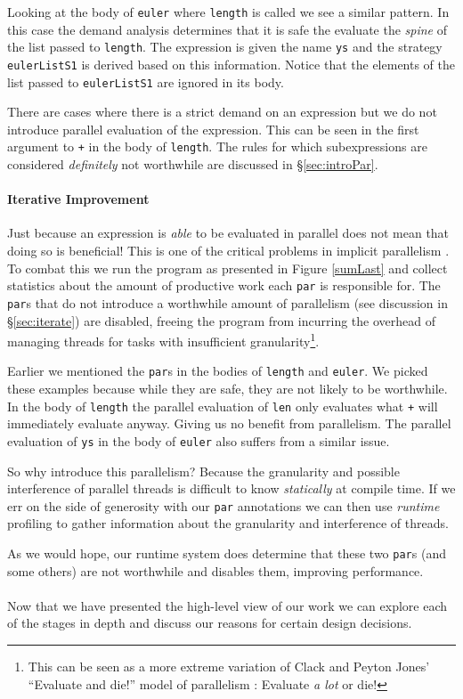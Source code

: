 Looking at the body of \verb-euler- where \verb-length- is called we see a
similar pattern. In this case the demand analysis determines that it is
safe the evaluate the \emph{spine} of the list passed to \verb-length-.
The expression is given the name \verb-ys- and the strategy \verb-eulerListS1-
is derived based on this information. Notice that the elements of the list
passed to \verb-eulerListS1- are ignored in its body. 

There are cases where there is a strict demand on an expression but we
do not introduce parallel evaluation of the expression. This can be seen
in the first argument to \verb-+- in the body of \verb-length-. The rules
for which subexpressions are considered \emph{definitely} not worthwhile
are discussed in \S\ref{sec:introPar}.

\paragraph{Iterative Improvement}

Just because an expression is \emph{able} to be evaluated in parallel does not
mean that doing so is beneficial! This is one of the critical problems in
implicit parallelism \citep{hogen1992automatic, hammond2000research,
Jones2009Tuning}. To combat this we run the program as presented in Figure
\ref{sumLast} and collect statistics about the amount of productive work
each \verb-par- is responsible for. The \verb-par-s that do not introduce
a worthwhile amount of parallelism (see discussion in \S\ref{sec:iterate})
are disabled, freeing the program from incurring the overhead of managing
threads for tasks with insufficient granularity\footnote{This can be seen
as a more extreme variation of Clack and Peyton Jones' ``Evaluate and die!''
model of parallelism \citep{clack1986four}: Evaluate \emph{a lot} or die!}.

Earlier we mentioned the \verb-par-s in the bodies of \verb-length- and
\verb-euler-. We picked these examples because while they are safe, they are
not likely to be worthwhile. In the body of \verb-length- the parallel
evaluation of \verb-len- only evaluates what \verb-+- will immediately evaluate
anyway. Giving us no benefit from parallelism. The parallel evaluation of
\verb-ys- in the body of \verb-euler- also suffers from a similar issue.

So why introduce this parallelism? Because the granularity and possible
interference of parallel threads is difficult to know \emph{statically} at
compile time. If we err on the side of generosity with our \verb-par-
annotations we can then use \emph{runtime} profiling to gather information
about the granularity and interference of threads. 

As we would hope, our runtime system does determine that these two \verb-par-s (and some
others) are not worthwhile and disables them, improving performance.

\paragraph{}

Now that we have presented the high-level view of our work we can explore each of
the stages in depth and discuss our reasons for certain design decisions.
